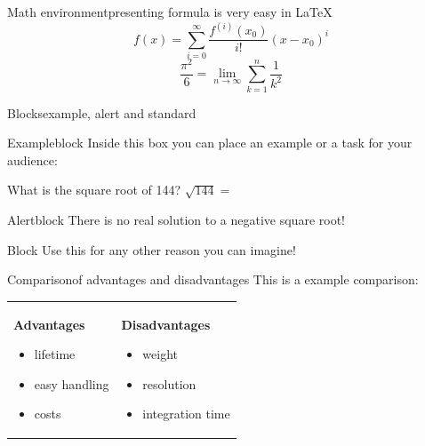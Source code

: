 \documentclass[	12pt, 				
				t,					
				aspectratio=169]{beamer}
\begin{document}
	
	
	\begin{frame}{Math environment}{presenting formula is very easy in \LaTeX}
		\vfill
		\begin{equation*}
			f(x)=\sum_{i=0}^\infty \frac{f^{(i)}(x_0)}{i!}(x-x_0)^i
		\end{equation*}
		\vfill
		\begin{equation*}
			\displaystyle\frac{\pi^2}{6}=\lim_{n \to \infty}\sum_{k=1}^n \frac{1}{k^2}
		\end{equation*}
		\vfill
	\end{frame}
	
	
	\begin{frame}{Blocks}{example, alert and standard}
	    \begin{exampleblock}{Exampleblock}
			Inside this box you can place an example or a task for your audience:
			
			What is the square root of 144? $\sqrt{144} = $
		\end{exampleblock}
		\begin{alertblock}{Alertblock}			
			There is no real solution to a negative square root!
		\end{alertblock}
		\begin{block}{Block}
			Use this for any other reason you can imagine!
		\end{block}
	\end{frame}
	
	
	\begin{frame}{Comparison}{of advantages and disadvantages}
		This is a example comparison:
		\begin{center}
		\begin{tabularx}{0.8\textwidth}{X|X}
			\textbf{Advantages}
			 \begin{itemize}[<2->]
			 	\item lifetime
			 	\item easy handling
			 	\item costs
			 \end{itemize} &
			\textbf{Disadvantages}
			 \begin{itemize}[<3->]
			 	\item weight
			 	\item resolution
			 	\item integration time
			 \end{itemize}
		\end{tabularx}
		\end{center}
	\end{frame}
	
\end{document}
